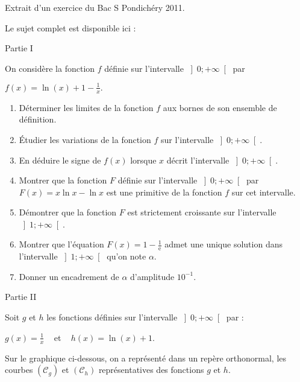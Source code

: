
%
Extrait d'un exercice du Bac S Pondichéry 2011.
\par
Le sujet complet est disponible ici : 
\begin{h3}Partie I \end{h3}
On considère la fonction $f$ définie sur l'intervalle $\left]0; +\infty \right[$ par

\begin{center}
$f\left(x\right)=\ln \left(x\right)+1-\frac{1}{x}.$
\end{center}

\begin{enumerate}
     \item
     Déterminer les limites de la fonction $f$ aux bornes de son ensemble de définition.
     \item
     Étudier les variations de la fonction $f$ sur l'intervalle $\left]0; +\infty \right[$.
     \item
     En déduire le signe de $f\left(x\right)$ lorsque $x$ décrit l'intervalle $\left]0; +\infty \right[$.
     \item
     Montrer que la fonction $F$ définie sur l'intervalle $\left]0; +\infty \right[$ par $F\left(x\right)=x \ln x-\ln x$ est une primitive de la fonction $f$ sur cet intervalle.
     \item
     Démontrer que la fonction $F$ est strictement croissante sur l'intervalle $\left]1; +\infty \right[$.
     \item
     Montrer que l'équation $F\left(x\right)=1-\frac{1}{\text{e}}$ admet une unique solution dans l'intervalle $\left]1;+\infty \right[$ qu'on note $\alpha $.
     \item
     Donner un encadrement de $\alpha $ d'amplitude $10^{-1}$.
\end{enumerate}
\begin{h3} Partie II \end{h3}
Soit $g$ et $h$ les fonctions définies sur l'intervalle $\left]0; +\infty \right[$ par :
\par
$g\left(x\right)=\frac{1}{x}$ ~ et ~ $ h\left(x\right)=\ln \left(x\right)+1.$
\par
Sur le graphique ci-dessous, on a représenté dans un repère orthonormal, les courbes $\left(\mathscr C_{g}\right)$ et $\left(\mathscr C_{h}\right)$ représentatives des fonctions $g$ et $h$.

